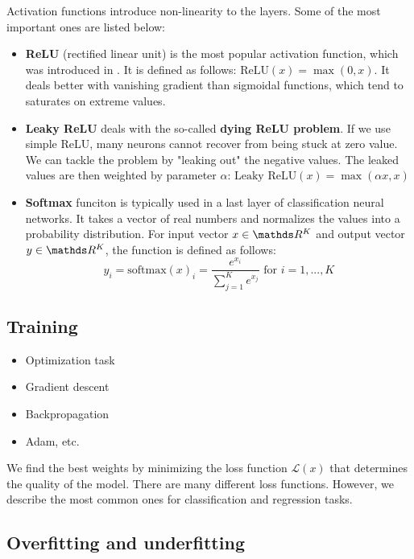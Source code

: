 Activation functions introduce non-linearity to the layers. Some of the most
important ones are listed below:
\begin{itemize}
    \item \textbf{ReLU} (rectified linear unit) is the most popular activation
          function, which was introduced in \cite{pmlr-v15-glorot11a}. It is defined
          as follows: $\text{ReLU}(x) = \max(0, x)$. It deals better with vanishing
          gradient than sigmoidal functions, which tend to saturates on extreme values.
    \item \textbf{Leaky ReLU} deals with the so-called
          \textbf{dying ReLU problem}. If we use simple ReLU, many neurons cannot
          recover from being stuck at zero value. We can tackle the problem by
          "leaking out" the negative values. The leaked values are then weighted by
          parameter $\alpha$: $\text{Leaky ReLU}(x) = \max(\alpha x, x)$
    \item \textbf{Softmax} funciton is typically used in a last layer of
          classification neural networks. It takes a vector of real numbers and
          normalizes the values into a probability distribution. For input vector
          $x \in \real^K$ and output vector $y \in \real^K$, the function is defined
          as follows:
          $$
              y_i = \text{softmax}(x)_i = \frac{e^{x_i}}{\sum\limits^{K}_{j = 1}
                  e^{x_j}} \text{ for } i = 1,...,K
          $$
\end{itemize}

\subsection{Training}
\label{sec:training}
\begin{itemize}
    \item Optimization task
    \item Gradient descent
    \item Backpropagation
    \item Adam, etc.
\end{itemize}
We find the best weights by minimizing the loss function $\mathcal{L}(x)$ that
determines the quality of the model. There are many different loss functions.
However, we describe the most common ones for classification and regression
tasks.



\subsection{Overfitting and underfitting}

